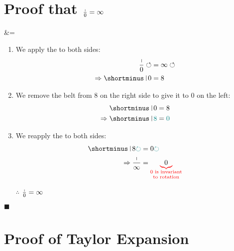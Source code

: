 \documentclass[12pt, titlepage,french]{article}
\begin{document}
\clearpage

\clearpage

\section{Proof that $\frac{\shortmid}{0}	=	\infty$}

\begin{theorems}[Theorem]
	&=	\infty
\end{theorems}

\begin{distributions}
\begin{enumerate}
	\item	We apply the  to both sides:
		\begin{align*}
		\frac{\shortmid}{0}	\circlearrowleft
		&=	\infty	\circlearrowleft	\\
	\Rightarrow	
		\shortminus\ \vrule\: 0
		&=	8
		\end{align*}
	\item	We remove the belt from 8 on the right side to give it to 0 on the left:
		\begin{align*}
		\shortminus\ \vrule\: 0
		&=	8	\\
		\Rightarrow
		\shortminus\ \vrule\: {\color{teal}8}
		&=	{\color{teal}0}
		\end{align*}
	\item	We reapply the  to both sides:
		\begin{align*}
		\shortminus\ \vrule\: 8{\color{teal}\circlearrowright}
		&=	0	{\color{teal}\circlearrowright}\\
	\Rightarrow	
		\frac{\shortmid }{\infty}	
		&=	{\color{red}\underbrace{\color{black}0}_{\scriptsize{\shortstack{0 is invariant\\ to rotation}}}}		\\
		\end{align*}
	\item[$\therefore$]	$\frac{\shortmid}{0} =	\infty$
\end{enumerate}
\end{distributions}
$\blacksquare$

\clearpage

\section{Proof of Taylor Expansion}
\end{document}
